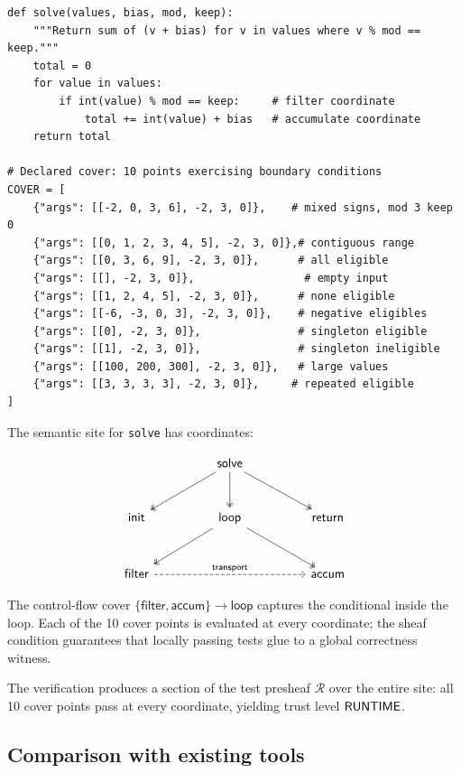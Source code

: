 \documentclass[11pt]{article}
\begin{document}
\begin{lstlisting}[style=jugeo-python,caption={Affine filtered sum: the
  function under verification.},label=lst:affine]
def solve(values, bias, mod, keep):
    """Return sum of (v + bias) for v in values where v % mod == keep."""
    total = 0
    for value in values:
        if int(value) % mod == keep:     # filter coordinate
            total += int(value) + bias   # accumulate coordinate
    return total

# Declared cover: 10 points exercising boundary conditions
COVER = [
    {"args": [[-2, 0, 3, 6], -2, 3, 0]},    # mixed signs, mod 3 keep 0
    {"args": [[0, 1, 2, 3, 4, 5], -2, 3, 0]},# contiguous range
    {"args": [[0, 3, 6, 9], -2, 3, 0]},      # all eligible
    {"args": [[], -2, 3, 0]},                 # empty input
    {"args": [[1, 2, 4, 5], -2, 3, 0]},      # none eligible
    {"args": [[-6, -3, 0, 3], -2, 3, 0]},    # negative eligibles
    {"args": [[0], -2, 3, 0]},               # singleton eligible
    {"args": [[1], -2, 3, 0]},               # singleton ineligible
    {"args": [[100, 200, 300], -2, 3, 0]},   # large values
    {"args": [[3, 3, 3, 3], -2, 3, 0]},     # repeated eligible
]
\end{lstlisting}

The semantic site for \texttt{solve} has coordinates:

\[
\begin{tikzcd}[column sep=1.6cm, row sep=1cm]
  & \mathsf{solve} \arrow[dl, two heads] \arrow[d, two heads]
    \arrow[dr, two heads] & \\
  \mathsf{init} & \mathsf{loop} \arrow[dl, two heads] \arrow[dr, two heads]
  & \mathsf{return} \\
  \mathsf{filter} \arrow[rr, dashed, "\mathsf{transport}"]
  & & \mathsf{accum}
\end{tikzcd}
\]

The control-flow cover $\{\mathsf{filter}, \mathsf{accum}\} \to
\mathsf{loop}$ captures the conditional inside the loop.  Each of the 10
cover points is evaluated at every coordinate; the sheaf condition guarantees
that locally passing tests glue to a global correctness witness.

The verification produces a section of the test presheaf $\mathcal{R}$ over
the entire site: all 10 cover points pass at every coordinate, yielding
trust level $\mathsf{RUNTIME}$.

\subsection{Comparison with existing tools}
\end{document}
